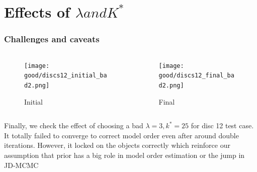 \documentclass[11pt]{beamer}
\begin{document}
\section{Effects of $\lambda and K^*$}
\begin{frame}
\frametitle{Challenges and caveats}
\begin{columns}
\begin{column}{.45\textwidth}
\begin{figure}
  \texttt{[image: good/discs12\_initial\_bad2.png]}
  \caption{Initial}
\end{figure}
\end{column}
\begin{column}{.45\textwidth}
\begin{figure}
  \texttt{[image: good/discs12\_final\_bad2.png]}
  \caption{Final}
\end{figure}
\end{column}
\end{columns}
Finally, we check the effect of choosing a bad $\lambda=3, k^*=25$ for disc 12 test case. 
It totally failed to converge to correct model order even after around double iterations. However,
it locked on the objects correctly which reinforce our assumption that prior has a big role in model order estimation or the jump in JD-MCMC
\end{frame}

\end{document}

